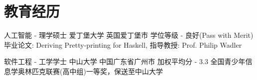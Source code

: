 \documentclass[11pt,a4paper,sans]{moderncv}
\begin{document}
\section{教育经历}
{人工智能 - 理学硕士}
{\textsf{爱丁堡大学}}
{英国爱丁堡市}
{学位等级 - 良好(Pass with Merit)} 
{毕业论文: Deriving Pretty-printing for Haskell, 指导教授: Prof. Philip Wadler}

{软件工程 - 工学学士}
{\textsf{中山大学}}
{中国广东省广州市}
{加权平均分 - 3.3} 
{全国青少年信息学奥林匹克联赛(高中组)一等奖，保送至中山大学}
\end{document}
